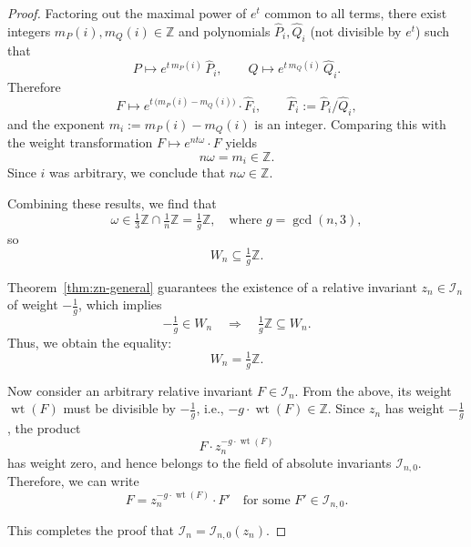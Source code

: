 \documentclass[10pt,a4paper]{amsart}
\begin{document}
\begin{proof}
Factoring out the maximal power of \(e^t\) common to all terms, there exist integers \(m_P(i),m_Q(i)\in\mathbb{Z}\) and polynomials \(\widehat P_i,\widehat Q_i\) (not divisible by \(e^t\)) such that
\[
P \mapsto e^{t\,m_P(i)}\,\widehat P_i,\qquad
Q \mapsto e^{t\,m_Q(i)}\,\widehat Q_i.
\]
Therefore
\[
F \mapsto e^{t\,\bigl(m_P(i)-m_Q(i)\bigr)}\cdot \widehat F_i,\qquad
\widehat F_i:=\widehat P_i/\widehat Q_i,
\]
and the exponent \(m_i:=m_P(i)-m_Q(i)\) is an integer. Comparing this with the weight transformation
\(
F \mapsto e^{n t \omega}\cdot F
\)
yields
\[
n\omega = m_i \in \mathbb{Z}.
\]
Since \(i\) was arbitrary, we conclude that \(n\omega\in\mathbb{Z}\).



Combining these results, we find that
\[
\omega \in \tfrac{1}{3} \mathbb{Z} \cap \tfrac{1}{n} \mathbb{Z} = \tfrac{1}{g} \mathbb{Z}, \quad \text{where } g= \gcd(n, 3),
\]
so
\[
W_n \subseteq \tfrac{1}{g} \mathbb{Z}.
\]

Theorem~\ref{thm:zn-general} guarantees the existence of a relative invariant \( z_n \in \mathcal{I}_n \) of weight \( -\tfrac{1}{g} \), which implies
\[
-\tfrac{1}{g} \in W_n \quad \Rightarrow \quad \tfrac{1}{g} \mathbb{Z} \subseteq W_n.
\]
Thus, we obtain the equality:
\[
W_n = \tfrac{1}{g} \mathbb{Z}.
\]

Now consider an arbitrary relative invariant \( F \in \mathcal{I}_n \). From the above, its weight \( \operatorname{wt}(F) \) must be divisible by \( -\tfrac{1}{g} \), i.e., \( -g \cdot \operatorname{wt}(F) \in \mathbb{Z} \). Since \( z_n \) has weight \( -\tfrac{1}{g} \), the product
\[
F \cdot z_n^{-g \cdot \operatorname{wt}(F)}
\]
has weight zero, and hence belongs to the field of absolute invariants \( \mathcal{I}_{n,0} \). Therefore, we can write
\[
F = z_n^{-g \cdot \operatorname{wt}(F)} \cdot F'
\quad \text{for some } F' \in \mathcal{I}_{n,0}.
\]

This completes the proof that \( \mathcal{I}_n = \mathcal{I}_{n,0}(z_n) \).
\end{proof}
\end{document}
